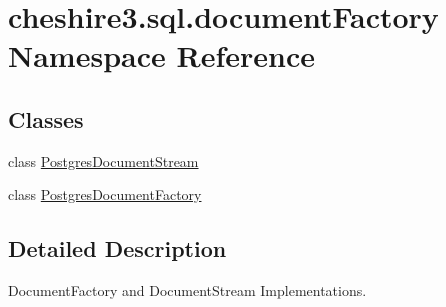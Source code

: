 \hypertarget{namespacecheshire3_1_1sql_1_1document_factory}{\section{cheshire3.\-sql.\-document\-Factory Namespace Reference}
\label{namespacecheshire3_1_1sql_1_1document_factory}
}
\subsection*{Classes}
\begin{DoxyCompactItemize}
\item 
class \hyperlink{classcheshire3_1_1sql_1_1document_factory_1_1_postgres_document_stream}{Postgres\-Document\-Stream}
\item 
class \hyperlink{classcheshire3_1_1sql_1_1document_factory_1_1_postgres_document_factory}{Postgres\-Document\-Factory}
\end{DoxyCompactItemize}


\subsection{Detailed Description}
\begin{DoxyVerb}DocumentFactory and DocumentStream Implementations.\end{DoxyVerb}
 